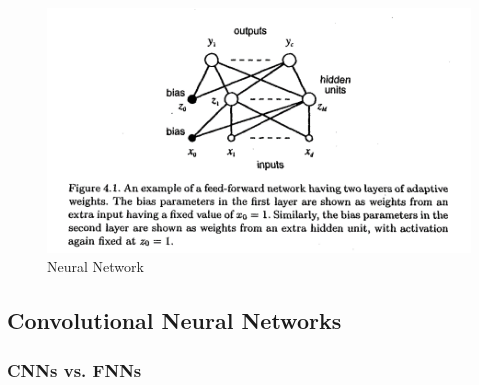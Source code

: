 \documentclass[12pt]{article}
\begin{document}
            
            \begin{figure}[ht]
            
                \begin{center}

                    \includegraphics[scale=1]{neural-network-bishop.png}
                    \caption{Neural Network \cite{bishop1995}}
                    \label{nn-bishop}
        
                \end{center}
                
            \end{figure}

          

        \subsection{Convolutional Neural Networks}

           \subsubsection{CNNs vs. FNNs}
\end{document}
